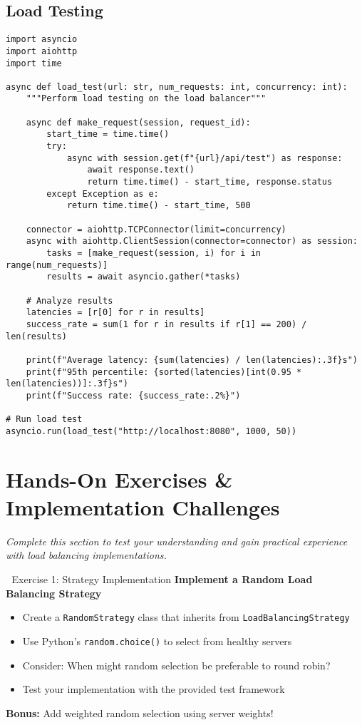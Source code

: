 \documentclass[12pt,a4paper]{article}
\begin{document}
\subsection{Load Testing}

\begin{lstlisting}[caption=Load Test Script]
import asyncio
import aiohttp
import time

async def load_test(url: str, num_requests: int, concurrency: int):
    """Perform load testing on the load balancer"""
    
    async def make_request(session, request_id):
        start_time = time.time()
        try:
            async with session.get(f"{url}/api/test") as response:
                await response.text()
                return time.time() - start_time, response.status
        except Exception as e:
            return time.time() - start_time, 500
    
    connector = aiohttp.TCPConnector(limit=concurrency)
    async with aiohttp.ClientSession(connector=connector) as session:
        tasks = [make_request(session, i) for i in range(num_requests)]
        results = await asyncio.gather(*tasks)
    
    # Analyze results
    latencies = [r[0] for r in results]
    success_rate = sum(1 for r in results if r[1] == 200) / len(results)
    
    print(f"Average latency: {sum(latencies) / len(latencies):.3f}s")
    print(f"95th percentile: {sorted(latencies)[int(0.95 * len(latencies))]:.3f}s")
    print(f"Success rate: {success_rate:.2%}")

# Run load test
asyncio.run(load_test("http://localhost:8080", 1000, 50))
\end{lstlisting}

\section{Hands-On Exercises \& Implementation Challenges}
\label{sec:exercises}

\textit{Complete this section to test your understanding and gain practical experience with load balancing implementations.}

\begin{exercisebox}{🚀 Exercise 1: Strategy Implementation}
\textbf{Implement a Random Load Balancing Strategy}
\begin{itemize}
    \item Create a \texttt{RandomStrategy} class that inherits from \texttt{LoadBalancingStrategy}
    \item Use Python's \texttt{random.choice()} to select from healthy servers
    \item Consider: When might random selection be preferable to round robin?
    \item Test your implementation with the provided test framework
\end{itemize}
\textbf{Bonus:} Add weighted random selection using server weights!
\end{exercisebox}
\end{document}
